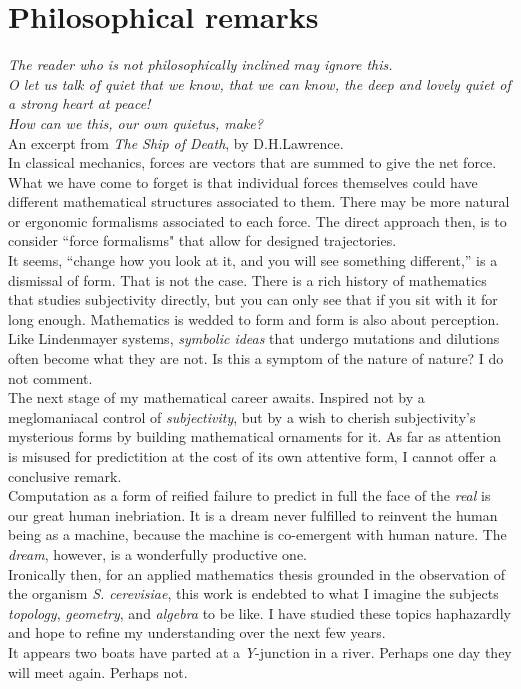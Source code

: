 \section{Philosophical remarks}

\textit{The reader who is not philosophically inclined may ignore this.}
\\

\textit{O let us talk of quiet that we know,
that we can know, the deep and lovely quiet
of a strong heart at peace!}
\\
\textit{How can we this, our own quietus, make?}
\\
An excerpt from \textit{The Ship of Death}, by D.H.Lawrence.
\\

In classical mechanics, forces are vectors that 
are summed to give the net force. What we have 
come to forget is that individual forces themselves
could have different mathematical structures associated 
to them. There may be more natural or ergonomic 
formalisms associated to each force. 
The direct approach then, is to consider 
``force formalisms" that allow for designed trajectories.
\\

It seems, ``change how you look at it, and you will see something 
different,'' is a dismissal of form. That is not the case. 
There is a rich history of mathematics that studies 
subjectivity directly, but you can only see that if you sit with 
it for long enough. Mathematics is wedded to form and form 
is also about perception.
\\

Like Lindenmayer systems, \textit{symbolic ideas} that undergo mutations
and dilutions often become what they are not. Is this a symptom 
of the nature of nature? I do not comment.
\\

The next stage of my mathematical career awaits. 
Inspired not by a meglomaniacal control of \textit{subjectivity}, 
but by a wish to cherish subjectivity's mysterious forms by 
building mathematical ornaments for it. As far 
as attention is misused for predictition at the cost 
of its own attentive form, I cannot offer a conclusive remark.
\\

Computation as a form of reified failure to predict 
in full the face of the \textit{real} is 
our great human inebriation. It is a dream 
never fulfilled to reinvent the human being 
as a machine, because the machine is co-emergent with
human nature. The \textit{dream}, however, 
is a wonderfully productive one.
\\

Ironically then, for an applied mathematics thesis grounded 
in the observation of the organism \textit{S. cerevisiae},
this work is endebted to what I imagine 
the subjects \textit{topology}, \textit{geometry}, and 
\textit{algebra} to be like. I have studied 
these topics haphazardly and hope to refine my 
understanding over the next few years.
\\

It appears two boats have parted at a \textit{Y}-junction in a river. 
Perhaps one day they will meet again. Perhaps not.
\\
